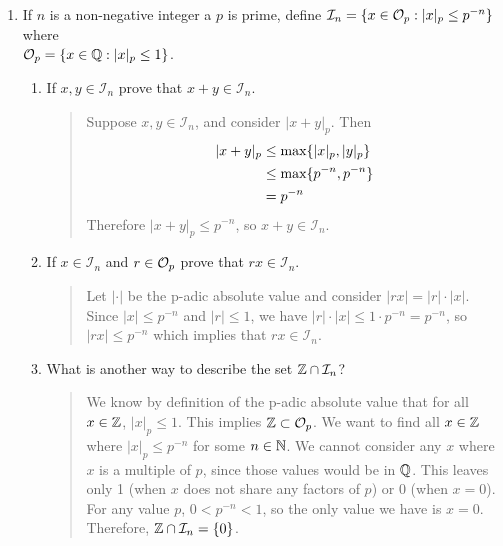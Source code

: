 \documentclass{hw}
\begin{document}
\begin{enumerate}
        \item If $n$ is a non-negative integer a $p$ is prime, define
        $\mathcal{I}_{n}=\{x\in\mathcal{O}_{p}:|x|_{p}\leq p^{-n}\}$ where\\ $\mathcal{O}_{p}=\{x\in\mathbb{Q} : |x|_{p}\leq1\}$.
        \begin{enumerate}
            \item If $x,y\in\mathcal{I}_{n}$ prove that $x+y\in\mathcal{I}_{n}$.
            \begin{quote}
                Suppose $x,y\in\mathcal{I}_{n}$, and consider $|x+y|_{p}$. Then
                \begin{align*}
                    |x+y|_{p} &\leq \text{max}\{ |x|_{p} , |y|_{p} \}\\
                    &\leq \text{max}\{ p^{-n} , p^{-n} \}\\
                    &= p^{-n}
                \end{align*}
                Therefore $|x+y|_{p}\leq p^{-n}$, so $x+y\in\mathcal{I}_{n}$.
            \end{quote}

            \item If $x\in\mathcal{I}_{n}$ and $r\in\mathcal{O}_{p}$ prove that $rx\in\mathcal{I}_{n}$.
            \begin{quote}
                Let $|\cdot|$ be the p-adic absolute value and consider $|rx| = |r|\cdot|x|$. Since $|x|\leq p^{-n}$ and $|r|\leq1$, we have $|r|\cdot|x|\leq 1\cdot p^{-n} = p^{-n}$, so $|rx|\leq p^{-n}$ which implies that $rx\in\mathcal{I}_{n}$.
            \end{quote}

            \item What is another way to describe the set $\mathbb{Z}\cap\mathcal{I}_{n}$?
            \begin{quote}
                We know by definition of the p-adic absolute value that for all $x\in\mathbb{Z}$, $|x|_{p}\leq1$. This implies
                $\mathbb{Z}\subset\mathcal{O}_{p}$. We want to find all $x\in\mathbb{Z}$ where $|x|_{p}\leq p^{-n}$ for some $n\in\mathbb{N}$.
                We cannot consider any $x$ where $x$ is a multiple of $p$, since those values would be in $\mathbb{Q}$. This
                leaves only 1 (when $x$ does not share any factors of $p$) or 0 (when $x=0$). For any value $p$,
                $0 < p^{-n} < 1$, so the only value we have is $x=0$. Therefore, $\mathbb{Z}\cap\mathcal{I}_{n}=\{0\}$.
            \end{quote}
        \end{enumerate}
    \end{enumerate}
\end{document}
